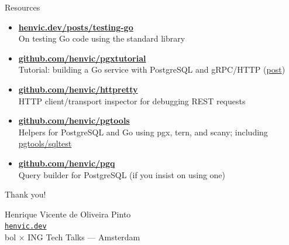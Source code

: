 \documentclass[aspectratio=169,11pt]{beamer}
\begin{document}
\begin{frame}{Resources}
  \begin{itemize}
    \setlength\itemsep{8pt}
    \item \href{https://henvic.dev/posts/testing-go/}{\textbf{henvic.dev/posts/testing-go}}\\
          {\small On testing Go code using the standard library}
    \item \href{https://github.com/henvic/pgxtutorial}{\textbf{github.com/henvic/pgxtutorial}}\\
          {\small Tutorial: building a Go service with PostgreSQL and gRPC/HTTP (\href{https://henvic.dev/posts/go-postgres/}{post})}
    \item \href{https://github.com/henvic/httpretty}{\textbf{github.com/henvic/httpretty}}\\
          {\small HTTP client/transport inspector for debugging REST requests}
    \item \href{https://github.com/henvic/pgtools}{\textbf{github.com/henvic/pgtools}}\\
          {\small Helpers for PostgreSQL and Go using pgx, tern, and scany; including \href{https://pkg.go.dev/github.com/henvic/pgtools/sqltest}{pgtools/sqltest}}
    \item \href{https://github.com/henvic/pgq}{\textbf{github.com/henvic/pgq}}\\
          {\small Query builder for PostgreSQL (if you insist on using one)}
  \end{itemize}
\end{frame}

\begin{frame}[standout]
  Thank you!

  \vspace{16pt}
  {\normalsize
  Henrique Vicente de Oliveira Pinto\\[4pt]
  \href{https://henvic.dev/}{\texttt{henvic.dev}}\\[10pt]
  bol \(\times\) ING Tech Talks --- Amsterdam
  }
\end{frame}
\end{document}
